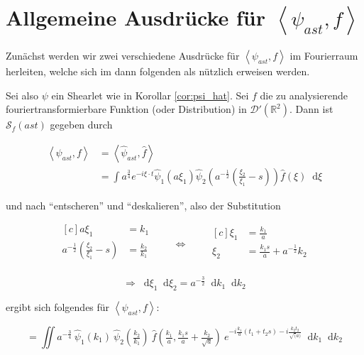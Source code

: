 \documentclass{scrartcl}
\renewcommand*\d{\mathop{}\!\mathrm{d}}
\begin{document}
\section{Allgemeine Ausdrücke für $\left<\psi_{ast}, f\right>$}

Zunächst werden wir zwei verschiedene Ausdrücke für $\left<\psi_{ast}, f\right>$
im Fourierraum herleiten, welche sich im dann folgenden als nützlich erweisen werden.

Sei also $\psi$ ein Shearlet wie in Korollar \ref{cor:psi_hat}. Sei $f$ die zu
analysierende fouriertransformierbare Funktion (oder Distribution) in
$\mathcal{D} \prime (\mathbb{R}^2)$. Dann ist $\mathcal{S}_f (ast)$ gegeben durch

\begin{align*}
\left< \psi_{ast}, f \right> &= \left<\hat\psi_{ast}, \hat f\right> \\
 &= \int a^\frac{3}{4} e^{-i \xi \cdot t} \hat \psi_1(a \xi_1)
    \hat \psi_2 \left(a^{-\frac{1}{2}} \left(\frac{\xi_2}{\xi_1} - s\right)\right)
    \hat f (\xi) \d \xi
\end{align*}

und nach "`entscheren"' und "`deskalieren"', also der Substitution

\begin{equation*}
\begin{aligned}[c]
a \xi_1 &= k_1\\
a^{-\frac{1}{2}} \left(\frac{\xi_2}{\xi_1} - s\right) &=\frac{k_2}{k_1}\\
\end{aligned}
\qquad\Longleftrightarrow\qquad
\begin{aligned}[c]
\xi_1 &= \frac{k_1}{a}\\
\xi_2 &= \frac{k_1 s}{a} + a^{-\frac{1}{2}} k_2\\
\end{aligned}
\end{equation*}

\begin{equation*}
\Rightarrow
\d \xi_1 \d \xi_2 = a^{-\frac{3}{2}} \d k_1 \d k_2
\end{equation*}

ergibt sich folgendes für $\left<\psi_{ast}, f\right>$:

\begin{equation}
\label{eq:psi_ast_f_1}
    =  \iint a^{-\frac{3}{4}}~\hat \psi_1(k_1) ~\hat \psi_2 \left(\tfrac{k_2}{k_1}\right)
    ~\hat f \left(\tfrac{k_1}{a}, \tfrac{k_1 s}{a} + \tfrac{k_2}{\sqrt{a}}\right)
    ~e^{-i\frac{k_1}{a}(t_1+t_2 s) - i \frac{k_2 t_2}{\sqrt(a)}}
    \d k_1 \d k_2
\end{equation}
\end{document}
